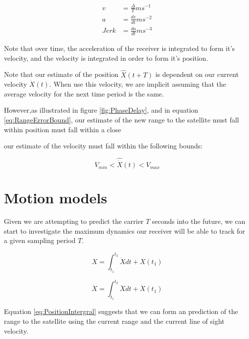 \begin{comment}
Need to fix this up
\end{comment}

\begin{align}
v & = \frac{\Delta}{T} m s^{-1} \\
a & = \frac{dv}{dt} m s^{-2} \\
Jerk & = \frac{da}{dt} m s^{-3}
\end{align}


Note that over time, the acceleration of the receiver is integrated to form it's velocity, and the velocity is integrated in order to form it's position. 

Note that our estimate of the position $\hat{X}(t+T)$ is dependent on our current velocity $\dot{X}(t)$. When use this velocity, we are implicit assuming that the average velocity for the next time period is the same. 

However,as illustrated in figure \ref{fig:PhaseDelay}, and in equation \ref{eq:RangeErrorBound}, our estimate of the new range to the satellite must fall within 
position must fall within a close 

our estimate of the velocity must fall within the following bounds:

\begin{equation}
V_{min} < \hat{\dot{X}}(t) < V_{max}
\end{equation}

\section{Motion models}

Given we are attempting to predict the carrier $T$ seconds into the future, we can start to investigate the maximum dynamics our receiver will be able to track for a given sampling period $T$. \cite{salas1999etgen}


\begin{equation}
X = \int_{t_1}^{t_2} \dot{X} dt + X(t_1)
\label{eq:PositionIntergral}
\end{equation}

\begin{equation}
\dot{X} = \int_{t_1}^{t_2} \ddot{X} dt + \dot{X}(t_1)
\end{equation}


Equation \ref{eq:PositionIntergral} suggests that we can form an prediction of the range to the satellite using the current range and the current line of sight velocity. 

